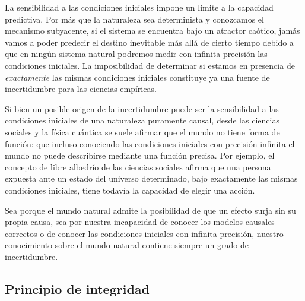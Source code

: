 \documentclass[a4paper,11pt]{book}
\theoremstyle{definition}
\begin{document}
%

La sensibilidad a las condiciones iniciales impone un l\'imite a la capacidad predictiva.
%
Por m\'as que la naturaleza sea determinista y conozcamos el mecanismo subyacente, si el sistema se encuentra bajo un atractor ca\'otico, jam\'as vamos a poder predecir el destino inevitable m\'as all\'a de cierto tiempo debido a que en ning\'un sistema natural podremos medir con infinita precisi\'on las condiciones iniciales.
%
La imposibilidad de determinar si estamos en presencia de \emph{exactamente} las mismas condiciones iniciales constituye ya una fuente de incertidumbre para las ciencias emp\'iricas.


Si bien un posible origen de la incertidumbre puede ser la sensibilidad a las condiciones iniciales de una naturaleza puramente causal, desde las ciencias sociales y la f\'isica cu\'antica se suele afirmar que el mundo no tiene forma de funci\'on: que incluso conociendo las condiciones iniciales con precisi\'on infinita el mundo no puede describirse mediante una funci\'on precisa.
%
Por ejemplo, el concepto de libre albedr\'io de las ciencias sociales afirma que una persona expuesta ante un estado del universo determinado, bajo exactamente las mismas condiciones iniciales, tiene todav\'ia la capacidad de elegir una acci\'on.


Sea porque el mundo natural admite la posibilidad de que un efecto surja sin su propia causa, sea por nuestra incapacidad de conocer los modelos causales correctos o de conocer las condiciones iniciales con infinita precisi\'on, nuestro conocimiento sobre el mundo natural contiene siempre un grado de incertidumbre.


\subsection{Principio de integridad}\label{sec:principio_integridad}
\end{document}
